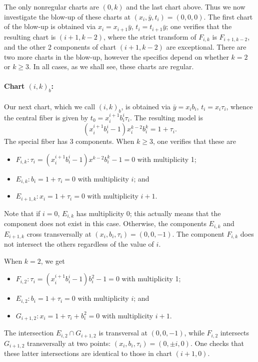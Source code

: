 \documentclass[reqno]{amsart}
\theoremstyle{definition}
\theoremstyle{remark}
\newcommand{\sy}{\bar{y}}
\begin{document}
The only nonregular charts are $(0,k)$ and the last chart above. Thus we now investigate the blow-up of these charts at $(x_i,\sy,t_i) = (0,0,0)$. The first chart of the blow-up is obtained via $x_{i} = x_{i+1} \sy$, $t_{i} = t_{i+1} \sy$; one verifies that the resulting chart is $(i+1, k-2)$, where the strict transform of $F_{i,k}$ is $F_{i+1, k-2}$, and the other 2 components of chart $(i + 1, k-2)$ are exceptional. There are two more charts in the blow-up, however the specifics depend on whether $k=2$ or $k \geq 3$. In all cases, as we shall see, these charts are regular.

\paragraph{Chart $(i,k)_b$:}
\label{sec:chart-i-k_b}

Our next chart, which we call $(i,k)_b$, is obtained via $\sy = x_ib_i$, $t_i = x_i\tau_i$, whence the central fiber is given by $t_0 = x_i^{i+1}b_i^i\tau_i$. The resulting model is
\[
(x_i^{i+1}b_i^i - 1)x_i^{k-2} b_i^k = 1 + \tau_i.
\]
The special fiber has 3 components. When $k \geq 3$, one verifies that these are
\begin{itemize}
    \item $F_{i,k}: \tau_i = (x_i^{i+1}b_i^i - 1)x^{k-2} b_i^k - 1 = 0$ with multiplicity 1;
    \item $E_{i,k}: b_i = 1+\tau_i = 0$ with multiplicity $i$; and
    \item $E_{i+1,k}: x_i = 1+\tau_i = 0$ with multiplicity $i+1$.
\end{itemize}
Note that if $i = 0$, $E_{i,k}$ has multiplicity $0$; this actually means that the component does not exist in this case. Otherwise,
the components $E_{i,k}$ and $E_{i+1,k}$ cross transversally at $(x_i, b_i, \tau_i) = (0, 0, -1)$. The component $F_{i,k}$ does not intersect the others regardless of the value of $i$.

When $k = 2$, we get
\begin{itemize}
    \item $F_{i,2}: \tau_i = (x_i^{i+1}b_i^i - 1) b_i^2 - 1 = 0$ with multiplicity 1;
    \item $E_{i,2}: b_i = 1+\tau_i = 0$ with multiplicity $i$; and
    \item $G_{i+1,2}: x_i = 1+\tau_i+b_i^2 = 0$ with multiplicity $i+1$.
\end{itemize}
The intersection $E_{i,2} \cap G_{i+1,2}$ is transversal at $(0,0,-1)$, while $F_{i,2}$ intersects $G_{i+1,2}$ transversally at two points: $(x_i, b_i, \tau_i) = (0, \pm i, 0)$. One checks that these latter intersections are identical to those in chart $(i+1,0)$.
\end{document}
